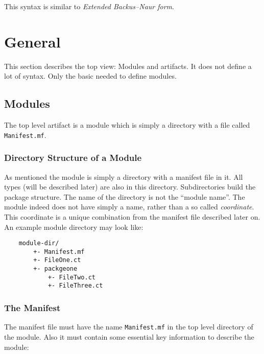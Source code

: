 \documentclass[a4paper,12pt]{report}
\begin{document}
This syntax is similar to \textit{Extended Backus–Naur form}\cite{ebnf-wiki}.

\chapter{General}

This section describes the top view: Modules and artifacts. It does not define a lot of syntax. Only the basic needed to define modules.

\section{Modules}

The top level artifact is a module which is simply a directory with a file called \texttt{Manifest.mf}.

\subsection{Directory Structure of a Module}

As mentioned the module is simply a directory with a manifest file in it. All types (will be described later) are also in this directory. Subdirectories build the package structure. The name of the directory is not the ``module name''. The module indeed does not have simply a name, rather than a so called \textit{coordinate}. This coordinate is a unique combination from the manifest file described later on. An example module directory may look like:

\begin{verbatim}
    module-dir/
        +- Manifest.mf
        +- FileOne.ct
        +- packgeone
            +- FileTwo.ct
            +- FileThree.ct
\end{verbatim}

\subsection{The Manifest}

The manifest file must have the name \texttt{Manifest.mf} in the top level directory of the module. Also it must contain some essential key information to describe the module:
\end{document}

